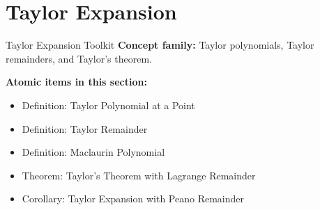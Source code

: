 \section{Taylor Expansion}

\begin{toolkitbox}{Taylor Expansion Toolkit}
\textbf{Concept family:} Taylor polynomials, Taylor remainders, and Taylor's theorem.

\medskip
\textbf{Atomic items in this section:}
\begin{itemize}
  \item Definition: Taylor Polynomial at a Point
  \item Definition: Taylor Remainder
  \item Definition: Maclaurin Polynomial
  \item Theorem: Taylor's Theorem with Lagrange Remainder
  \item Corollary: Taylor Expansion with Peano Remainder
\end{itemize}
\end{toolkitbox}


